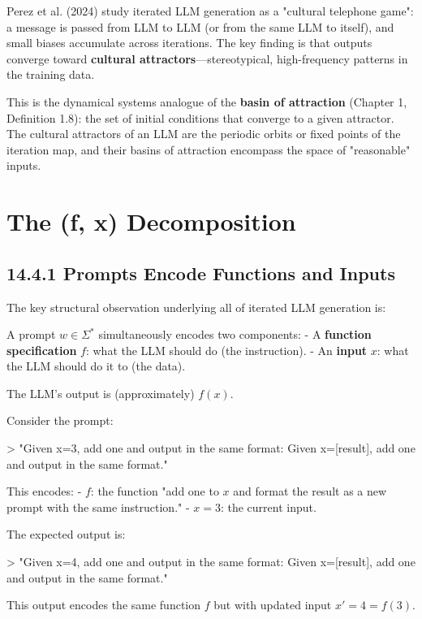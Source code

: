 Perez et al. (2024) study iterated LLM generation as a "cultural telephone game": a message is passed from LLM to LLM (or from the same LLM to itself), and small biases accumulate across iterations. The key finding is that outputs converge toward \textbf{cultural attractors}---stereotypical, high-frequency patterns in the training data.

This is the dynamical systems analogue of the \textbf{basin of attraction} (Chapter 1, Definition 1.8): the set of initial conditions that converge to a given attractor. The cultural attractors of an LLM are the periodic orbits or fixed points of the iteration map, and their basins of attraction encompass the space of "reasonable" inputs.



\section{The (f, x) Decomposition}

\subsection{14.4.1 Prompts Encode Functions and Inputs}

The key structural observation underlying all of iterated LLM generation is:

\begin{observation}
A prompt $w \in \Sigma^*$ simultaneously encodes two components:
- A \textbf{function specification} $f$: what the LLM should do (the instruction).
- An \textbf{input} $x$: what the LLM should do it to (the data).

The LLM's output is (approximately) $f(x)$.
\end{observation}

\begin{example}
Consider the prompt:

> "Given x=3, add one and output in the same format: Given x=[result], add one and output in the same format."

This encodes:
- $f$: the function "add one to $x$ and format the result as a new prompt with the same instruction."
- $x = 3$: the current input.

The expected output is:

> "Given x=4, add one and output in the same format: Given x=[result], add one and output in the same format."

This output encodes the same function $f$ but with updated input $x' = 4 = f(3)$.
\end{example}

